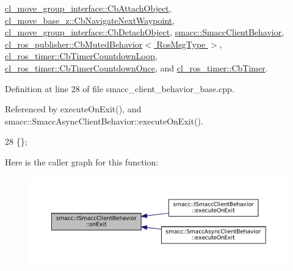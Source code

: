 \hyperlink{classcl__move__group__interface_1_1CbAttachObject_a6e85287bde0cedc12a90da8776ed4a16}{cl\+\_\+move\+\_\+group\+\_\+interface\+::\+Cb\+Attach\+Object}, \hyperlink{classcl__move__base__z_1_1CbNavigateNextWaypoint_a1a848f7bfedd23fea7de59a940257b05}{cl\+\_\+move\+\_\+base\+\_\+z\+::\+Cb\+Navigate\+Next\+Waypoint}, \hyperlink{classcl__move__group__interface_1_1CbDetachObject_ae5c6ada3c6631c9fa0bfb2d461ce4678}{cl\+\_\+move\+\_\+group\+\_\+interface\+::\+Cb\+Detach\+Object}, \hyperlink{classsmacc_1_1SmaccClientBehavior_a7e4fb6ce81ff96dc172425852d69c0c5}{smacc\+::\+Smacc\+Client\+Behavior}, \hyperlink{classcl__ros__publisher_1_1CbMutedBehavior_a4c02187c58358fa811777d9956510222}{cl\+\_\+ros\+\_\+publisher\+::\+Cb\+Muted\+Behavior$<$ Ros\+Msg\+Type $>$}, \hyperlink{classcl__ros__timer_1_1CbTimerCountdownLoop_a5623e9fdd8f0fb23e8707f7816c099d6}{cl\+\_\+ros\+\_\+timer\+::\+Cb\+Timer\+Countdown\+Loop}, \hyperlink{classcl__ros__timer_1_1CbTimerCountdownOnce_ab602b778a299b42e8cc9f4bf3da0a234}{cl\+\_\+ros\+\_\+timer\+::\+Cb\+Timer\+Countdown\+Once}, and \hyperlink{classcl__ros__timer_1_1CbTimer_a04184e2679c32363c876e1d6b4746072}{cl\+\_\+ros\+\_\+timer\+::\+Cb\+Timer}.



Definition at line 28 of file smacc\+\_\+client\+\_\+behavior\+\_\+base.\+cpp.



Referenced by execute\+On\+Exit(), and smacc\+::\+Smacc\+Async\+Client\+Behavior\+::execute\+On\+Exit().


\begin{DoxyCode}
28 \{\};
\end{DoxyCode}
Here is the caller graph for this function\+:
\nopagebreak
\begin{figure}[H]
\begin{center}
\leavevmode
\includegraphics[width=350pt]{classsmacc_1_1ISmaccClientBehavior_ad1198fdb2cbdf11f3276d3e23d4c0a50_icgraph}
\end{center}
\end{figure}
\mbox{\label{classsmacc_1_1ISmaccClientBehavior_a6765b53cec4eb8c663cc8c2d63649ae4}} 
